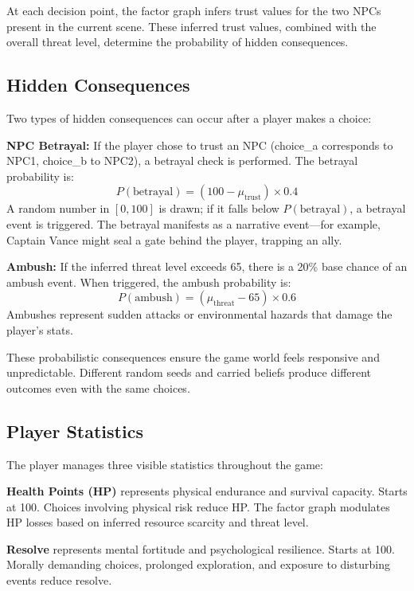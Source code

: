 \documentclass[journal]{IEEEtran}
\begin{document}
At each decision point, the factor graph infers trust values for the two NPCs present in the current scene. These inferred trust values, combined with the overall threat level, determine the probability of hidden consequences.

\subsection{Hidden Consequences}

Two types of hidden consequences can occur after a player makes a choice:

\textbf{NPC Betrayal:} If the player chose to trust an NPC (choice\_a corresponds to NPC1, choice\_b to NPC2), a betrayal check is performed. The betrayal probability is:
\begin{equation}
P(\text{betrayal}) = (100 - \mu_{\text{trust}}) \times 0.4
\end{equation}
A random number in $[0, 100]$ is drawn; if it falls below $P(\text{betrayal})$, a betrayal event is triggered. The betrayal manifests as a narrative event---for example, Captain Vance might seal a gate behind the player, trapping an ally.

\textbf{Ambush:} If the inferred threat level exceeds 65, there is a 20\% base chance of an ambush event. When triggered, the ambush probability is:
\begin{equation}
P(\text{ambush}) = (\mu_{\text{threat}} - 65) \times 0.6
\end{equation}
Ambushes represent sudden attacks or environmental hazards that damage the player's stats.

These probabilistic consequences ensure the game world feels responsive and unpredictable. Different random seeds and carried beliefs produce different outcomes even with the same choices.

\subsection{Player Statistics}

The player manages three visible statistics throughout the game:

\textbf{Health Points (HP)} represents physical endurance and survival capacity. Starts at 100. Choices involving physical risk reduce HP. The factor graph modulates HP losses based on inferred resource scarcity and threat level.

\textbf{Resolve} represents mental fortitude and psychological resilience. Starts at 100. Morally demanding choices, prolonged exploration, and exposure to disturbing events reduce resolve.
\end{document}
